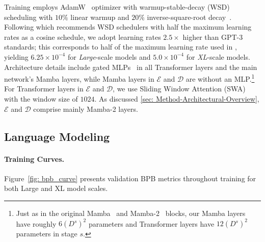 \documentclass{article}
\newcommand{\citep}{\parencite}
\newcommand{\citet}{\textcite}
\newcommand{\main}{main network}
\theoremstyle{plain}
\theoremstyle{remark}
\begin{document}
Training employs AdamW~\citep{AdamW} optimizer with warmup-stable-decay (WSD)~\citep{WSD} scheduling with $10\%$ linear warmup and $20\%$ inverse-square-root decay~\citep{Inverse-Square-Root-Decay}.
Following \citet{hagele2024scaling} which recommends WSD schedulers with half the maximum learning rates as a cosine schedule, we adopt learning rates $2.5\times$ higher than GPT-3~\citep{GPT2} standards; this corresponds to half of the maximum learning rate used in \citet{Mamba}, yielding $6.25 \times 10^{-4}$ for \textit{Large}-scale models and $5.0 \times 10^{-4}$ for \textit{XL}-scale models.
Architecture details include gated MLPs~\citep{Llama2} in all Transformer layers and the \main{}'s Mamba layers, while Mamba layers in $\mathcal{E}$ and $\mathcal{D}$ are without an MLP.\footnote{Just as in the original Mamba~\citep{Mamba} and Mamba-2~\citep{Mamba2} blocks, our Mamba layers have roughly $6(D^s)^2$ parameters and Transformer layers have $12(D^s)^2$ parameters in stage $s$.}
For Transformer layers in $\mathcal{E}$ and $\mathcal{D}$, we use Sliding Window Attention (SWA)~\citep{longformer} with the window size of $1024$.
As discussed \cref{sec: Method-Architectural-Overview}, $\mathcal{E}$ and $\mathcal{D}$ comprise mainly Mamba-2 layers.

\subsection{Language Modeling}

\label{sec: lang}

\paragraph{Training Curves.}

Figure~\ref{fig: bpb_curve} presents validation BPB metrics throughout training for both Large and XL model scales.
\end{document}
